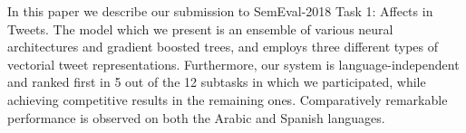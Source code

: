 In this paper we describe our submission to SemEval-2018 Task 1: Affects in Tweets. The model which we present is an ensemble of various neural architectures and gradient boosted trees, and employs three different types of vectorial tweet representations. Furthermore, our system is language-independent and ranked first in 5 out of the 12 subtasks in which we participated, while achieving competitive results in the remaining ones. Comparatively remarkable performance is observed on both the Arabic and Spanish languages.
